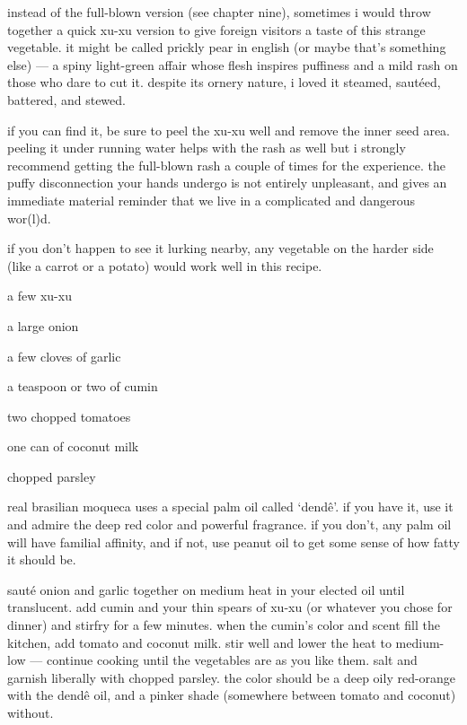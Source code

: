 instead of the full-blown version (see chapter nine), sometimes i would throw 
together a quick xu-xu version to give foreign visitors a taste of this 
strange vegetable. it might be called prickly pear in english (or maybe that's 
something else) --- a spiny light-green affair whose flesh inspires puffiness 
and a mild rash on those who dare to cut it. despite its ornery nature, i 
loved it steamed, saut\'{e}ed, battered, and stewed.

if you can find it, be sure to peel the xu-xu well and remove the inner seed 
area. peeling it under running water helps with the rash as well but i 
strongly recommend getting the full-blown rash a couple of times for the 
experience. the puffy disconnection your hands undergo is not entirely 
unpleasant, and gives an immediate material reminder that we live in a 
complicated and dangerous wor(l)d.

if you don't happen to see it lurking nearby, any vegetable on the harder side 
(like a carrot or a potato) would work well in this recipe.

\begin{ingredients}
  \item a few xu-xu
  \item a large onion
  \item a few cloves of garlic
  \item a teaspoon or two of cumin
  \item two chopped tomatoes
  \item one can of coconut milk
  \item chopped parsley
\end{ingredients}

real brasilian moqueca uses a special palm oil called `dend\^{e}'. if you have 
it, use it and admire the deep red color and powerful fragrance. if you don't, 
any palm oil will have familial affinity, and if not, use peanut oil to get 
some sense of how fatty it should be.

saut\'{e} onion and garlic together on medium heat in your elected oil until 
translucent. add cumin and your thin spears of xu-xu (or whatever you chose 
for dinner) and stirfry for a few minutes. when the cumin's color and scent 
fill the kitchen, add tomato and coconut milk. stir well and lower the heat to 
medium-low --- continue cooking until the vegetables are as you like them. 
salt and garnish liberally with chopped parsley. the color should be a deep 
oily red-orange with the dend\^{e} oil, and a pinker shade (somewhere between 
tomato and coconut) without.

